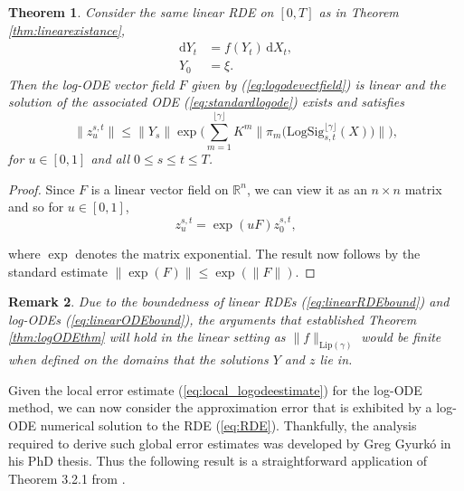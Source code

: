 \documentclass{article}
\def\floor#1{\lfloor #1 \rfloor}
\newcommand{\R}{\mathbb{R}}
\newtheorem{theorem}{Theorem}[section]
\newtheorem{proof}[theorem]{Proof}
\newtheorem{remark}[theorem]{Remark}
\newcommand{\logsig}{\mathrm{LogSig}}
\newcommand{\dby}{\mathrm{d}}
\begin{document}
\begin{theorem}
Consider the same linear RDE on $[0,T]$ as in Theorem \ref{thm:linearexistance},
\begin{align*}
\dby Y_t & = f(Y_t)\,\dby X_t,\\
Y_0 & = \xi.\nonumber
\end{align*}
Then the log-ODE vector field $F$ given by (\ref{eq:logodevectfield}) is linear and the solution of the associated ODE (\ref{eq:standardlogode}) exists and satisfies
\begin{equation}
\|z_u^{s,t}\| \leq \|Y_s\|\exp\bigg(\sum_{m=1}^{\floor{\gamma}}K^m \Big\|\pi_m\Big(\logsig_{s,t}^{\floor{\gamma}}(X)\Big)\Big\|\bigg),
\label{eq:linearODEbound}
\end{equation}
for $u\in[0,1]$ and all $0\leq s\leq t\leq T$.
\end{theorem}
\begin{proof}
Since $F$ is a linear vector field on $\R^n$, we can view it as an $n\times n$ matrix and so for $u\in[0,1]$,
\begin{equation}
z_u^{s,t} = \exp(uF)z_0^{s,t},\nonumber
\end{equation}

where $\exp$ denotes the matrix exponential. The result now follows by the standard estimate $\|\exp(F)\| \leq \exp(\|F\|)$.
\end{proof}
\begin{remark}\label{rmk:linear_rmk}
Due to the boundedness of linear RDEs (\ref{eq:linearRDEbound}) and log-ODEs (\ref{eq:linearODEbound}), the arguments that established Theorem \ref{thm:logODEthm} will hold in the linear setting as $\|f\|_{\mathrm{Lip}(\gamma)}$ would be finite when defined on the domains that the solutions $Y$ and $z$ lie in.
\end{remark}

Given the local error estimate (\ref{eq:local_logodeestimate}) for the log-ODE method, we can now consider the approximation error that is exhibited by a log-ODE numerical solution to the RDE (\ref{eq:RDE}). Thankfully, the analysis required to derive such global error estimates was developed by Greg Gyurk\'{o} in his PhD thesis. 
Thus the following result is a straightforward application of Theorem 3.2.1 from \citet{gyurko2008thesis}.\medbreak
\end{document}
